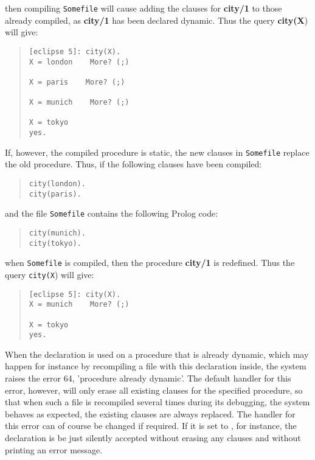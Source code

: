 then compiling {\tt Somefile} will cause adding
the clauses for {\bf city/1} to those
already compiled, as {\bf city/1} has been declared dynamic.
Thus the query  {\bf city(X}) will give:
\begin{quote}
\begin{verbatim}
[eclipse 5]: city(X).
X = london    More? (;)

X = paris    More? (;)

X = munich    More? (;)

X = tokyo
yes.
\end{verbatim}
\end{quote}

If, however, the compiled procedure is static,
the new clauses in {\tt Somefile} replace the old procedure.
Thus, if
the following clauses have been compiled:
\begin{quote}
\begin{verbatim}
city(london).
city(paris).
\end{verbatim}
\end{quote}
and the file {\tt Somefile} contains the following Prolog code:
\begin{quote}
\begin{verbatim}
city(munich).
city(tokyo).
\end{verbatim}
\end{quote}
when {\tt Somefile} is compiled, then the procedure {\bf city/1} is redefined.
Thus the query {\tt city(X}) will give:
\begin{quote}
\begin{verbatim}
[eclipse 5]: city(X).
X = munich    More? (;)

X = tokyo
yes.
\end{verbatim}
\end{quote}

When the  declaration is used on a procedure that is
already dynamic, which may happen for instance by recompiling a file
with this declaration inside, the system raises the error 64,
'procedure already dynamic'.
The default handler for this error, however, will only erase
all existing clauses for the specified procedure, so that
when such a file is recompiled several times during its debugging,
the system behaves as expected, the existing clauses
are always replaced.
The handler for this error can of course be changed if required.
If it is set to , for instance,
the  declaration is be just silently
accepted without erasing any clauses and without printing an error message.

